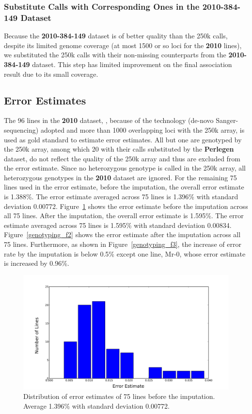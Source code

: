 \documentclass[a4paper,10pt]{article}
\begin{document}
\subsubsection{Substitute Calls with Corresponding Ones in the \textbf{2010-384-149} Dataset}
Because the \textbf{2010-384-149} dataset is of better quality than the 250k calls, despite its limited genome coverage (at most 1500 or so loci for the \textbf{2010} lines), we substituted the 250k calls with their non-missing counterparts from the \textbf{2010-384-149} dataset. This step has limited improvement on the final association result due to its small coverage.

\subsection{Error Estimates}

The 96 lines in the \textbf{2010} dataset, \cite{Nordborg2005}, because of the technology (de-novo Sanger-sequencing) adopted and more than 1000 overlapping loci with the 250k array, is used as gold standard to estimate error estimates. All but one are genotyped by the 250k array, among which 20 with their calls substituted by the \textbf{Perlegen} dataset, do not reflect the quality of the 250k array and thus are excluded from the error estimate. Since no heterozygous genotype is called in the 250k array, all heterozygous genotypes in the \textbf{2010} dataset are ignored. For the remaining 75 lines used in the error estimate, before the imputation, the overall error estimate is 1.388\%. The error estimate averaged across 75 lines is 1.396\% with standard deviation 0.00772. Figure~\ref{genotyping_f1} shows the error estimate before the imputation across all 75 lines. After the imputation, the overall error estimate is 1.595\%. The error estimate averaged across 75 lines is 1.595\% with standard deviation 0.00834. Figure~\ref{genotyping_f2} shows the error estimate after the imputation across all 75 lines. Furthermore, as shown in Figure~\ref{genotyping_f3}, the increase of error rate by the imputation is below 0.5\% except one line, Mr-0, whose error estimate is increased by 0.96\%.

\begin{figure}
  \includegraphics[width=1.0\textwidth]{figures/call_method_35_vs_2010_mismatch_rate_hist.png}
  \caption{Distribution of error estimates of 75 lines before the imputation. Average 1.396\% with standard deviation 0.00772.}\label{genotyping_f1}
\end{figure}
\end{document}
